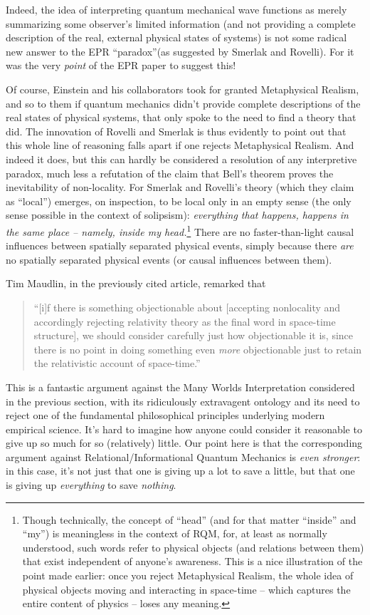 \documentclass[12pt]{article}
\begin{document}
Indeed, the idea of interpreting quantum mechanical wave functions as
merely summarizing some observer's limited information (and not providing a
complete description of the real, external 
physical states of systems) is not some
radical new answer to the EPR ``paradox''(as suggested by Smerlak and
Rovelli).   For it was the very
\emph{point} of the EPR paper to suggest this!

Of course, Einstein and his collaborators took for granted
Metaphysical Realism, and so to them if quantum mechanics didn't
provide complete descriptions of the real states of physical systems,
that only spoke to the need to find a theory that did.  The innovation
of Rovelli and Smerlak is thus evidently to point out that this whole
line of reasoning falls apart if one rejects Metaphysical Realism.
And indeed it does, but this can hardly be considered a resolution of
any interpretive paradox, much less a refutation of the claim that
Bell's theorem proves the inevitability of non-locality.  For Smerlak
and Rovelli's theory (which they claim as ``local'') emerges, on
inspection, to be local only in an empty sense (the only sense
possible in the context of solipsism):  \emph{everything that happens,
  happens in the same place -- namely, inside my
  head.}\footnote{Though 
technically, the concept of ``head'' (and for that matter
``inside'' and ``my'') is meaningless in the context of RQM, for, at
least as normally understood, such words refer to physical objects
(and relations between them) that exist independent of anyone's
awareness.
This is a nice illustration of the point made earlier:  once you reject
Metaphysical Realism, the whole idea of physical objects moving and
interacting in space-time -- which captures the entire content of
physics -- loses any meaning.}
There are no faster-than-light causal influences between spatially
separated physical events, simply because there \emph{are} no spatially 
separated physical events (or causal influences between them).

Tim Maudlin, in the previously cited article, remarked that 
\begin{quote}``[i]f there is something objectionable
about [accepting nonlocality and accordingly rejecting relativity
theory as the final word in space-time structure], we should consider
carefully just how objectionable it is, since there is no point in
doing something even \emph{more} objectionable just to retain the
relativistic account of space-time.''
\end{quote}
This is a fantastic argument against the Many Worlds Interpretation
considered in the previous section, with its ridiculously extravagent
ontology and its need to reject one of the fundamental philosophical 
principles underlying modern empirical science.  It's hard to imagine
how anyone could consider it reasonable to give up so much for
so (relatively) little. 
Our point here is that the corresponding argument against 
Relational/Informational Quantum Mechanics is \emph{even stronger}:
in this case, it's not just that one is giving up a lot to save a
little, but that one is giving up \emph{everything} to save
\emph{nothing}.  
\end{document}
